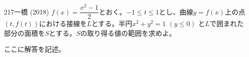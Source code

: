 \begin{prob}{217}{}{一橋 (2018)}
 $f(x)=\dfrac{x^2-1}{2}$とおく。$-1\le t \le 1$とし、曲線$y=f(x)$上の点$\left(t,f(t)\right)$における接線を$L$とする。半円$x^2+y^2=1$ $(y\le 0)$ と$L$で囲まれた部分の面積を$S$とする。$S$の取り得る値の範囲を求めよ。
\end{prob}
ここに解答を記述。